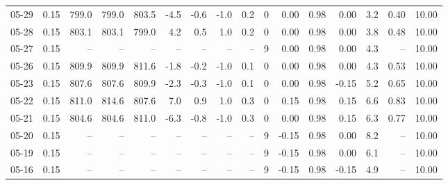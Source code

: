 \begin{threeparttable}
{\begin{tabular}{lrrrrrrrrrrrrrrr}
  05-29 &     0.15 & 799.0 & 799.0 & 803.5 &       -4.5 &           -0.6 &                     -1.0 &                 0.2 &              0 &       0.00 &      0.98 &           0.00 &              3.2 &            0.40 &                  10.00 \\
  05-28 &     0.15 & 803.1 & 803.1 & 799.0 &        4.2 &            0.5 &                      1.0 &                 0.2 &              0 &       0.00 &      0.98 &           0.00 &              3.8 &            0.48 &                  10.00 \\
  05-27 &     0.15 &    -- &    -- &    -- &         -- &             -- &                       -- &                  -- &              9 &       0.00 &      0.98 &           0.00 &              4.3 &              -- &                  10.00 \\
  05-26 &     0.15 & 809.9 & 809.9 & 811.6 &       -1.8 &           -0.2 &                     -1.0 &                 0.1 &              0 &       0.00 &      0.98 &           0.00 &              4.3 &            0.53 &                  10.00 \\
  05-23 &     0.15 & 807.6 & 807.6 & 809.9 &       -2.3 &           -0.3 &                     -1.0 &                 0.1 &              0 &       0.00 &      0.98 &          -0.15 &              5.2 &            0.65 &                  10.00 \\
  05-22 &     0.15 & 811.0 & 814.6 & 807.6 &        7.0 &            0.9 &                      1.0 &                 0.3 &              0 &       0.15 &      0.98 &           0.15 &              6.6 &            0.83 &                  10.00 \\
  05-21 &     0.15 & 804.6 & 804.6 & 811.0 &       -6.3 &           -0.8 &                     -1.0 &                 0.3 &              0 &       0.00 &      0.98 &           0.15 &              6.3 &            0.77 &                  10.00 \\
  05-20 &     0.15 &    -- &    -- &    -- &         -- &             -- &                       -- &                  -- &              9 &      -0.15 &      0.98 &           0.00 &              8.2 &              -- &                  10.00 \\
  05-19 &     0.15 &    -- &    -- &    -- &         -- &             -- &                       -- &                  -- &              9 &      -0.15 &      0.98 &           0.00 &              6.1 &              -- &                  10.00 \\
  05-16 &     0.15 &    -- &    -- &    -- &         -- &             -- &                       -- &                  -- &              9 &      -0.15 &      0.98 &          -0.15 &              4.9 &              -- &                  10.00 \\

\end{tabular}}
\end{threeparttable}

